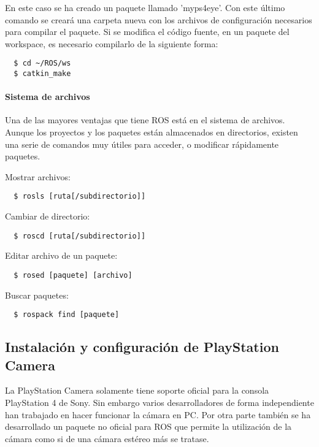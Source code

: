 En este caso se ha creado un paquete llamado 'myps4eye'. Con este último comando
se creará una carpeta nueva con los archivos de configuración necesarios para
compilar el paquete. Si se modifica el código fuente, en un paquete del
workspace, es necesario compilarlo de la siguiente forma:
\\
\begin{lstlisting}
  $ cd ~/ROS/ws
  $ catkin_make
\end{lstlisting}

\paragraph{Sistema de archivos} \hspace{0pt}

Una de las mayores ventajas que tiene ROS está en el sistema de archivos. Aunque
los proyectos y los paquetes están almacenados en directorios, existen una serie
de comandos muy útiles para acceder, o modificar rápidamente paquetes.

Mostrar archivos:
\\
\begin{lstlisting}
  $ rosls [ruta[/subdirectorio]]
\end{lstlisting}

Cambiar de directorio:
\\
\begin{lstlisting}
  $ roscd [ruta[/subdirectorio]]
\end{lstlisting}

Editar archivo de un paquete:
\\
\begin{lstlisting}
  $ rosed [paquete] [archivo]
\end{lstlisting}

Buscar paquetes:
\\
\begin{lstlisting}
  $ rospack find [paquete]
\end{lstlisting}


\subsection{Instalación y configuración de PlayStation Camera}

La PlayStation Camera solamente tiene soporte oficial para la consola
PlayStation 4 de Sony. Sin embargo varios desarrolladores de forma independiente
han trabajado en hacer funcionar la cámara en PC. Por otra parte también se ha
desarrollado un paquete no oficial para ROS que permite la utilización de la
cámara como si de una cámara estéreo más se tratase.

